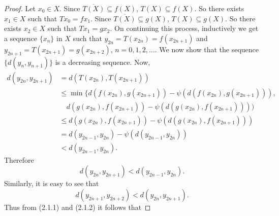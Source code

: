\documentclass[11]{article}
\numberwithin{equation}{definition}
\begin{document}
\begin{proof}
Let $x_{0}\in X.$ Since $\overline{T(X)}\subseteq f(X)$, $T(X)\subseteq f(X).$ So there exists $x_{1}\in X$ such that $Tx_{0}=fx_{1}.$
Since $\overline{T(X)}\subseteq g(X)$, $T(X)\subseteq g(X).$ So there exists $x_{2}\in X$ such that $Tx_{1}=gx_{2}.$
On continuing this process, inductively we get a sequence $\{x_{n}\}$ in $X$ such that $y_{2n}=T(x_{2n})=f(x_{2n+1})$ and $y_{2n+1}=T(x_{2n+1})=g(x_{2n+2})$, $n=0,1,2,\ldots.$
We now show that the sequence $\{d(y_{n},y_{n+1})\}$ is a decreasing sequence. Now,
\begin{align*}
d(y_{2n},y_{2n+1}) &= d(T(x_{2n}),T(x_{2n+1})) \\
&\leq \min\{d(f(x_{2n}),g(x_{2n+1}))-\psi(d(f(x_{2n}),g(x_{2n+1}))), \\
&\quad d(g(x_{2n}),f(x_{2n+1}))-\psi(d(g(x_{2n}),f(x_{2n+1})))) \\
&\leq d(g(x_{2n}),f(x_{2n+1}))-\psi(d(g(x_{2n}),f(x_{2n+1}))) \\
&= d(y_{2n-1},y_{2n})-\psi(d(y_{2n-1},y_{2n})) \\
&< d(y_{2n-1},y_{2n}).
\end{align*}
Therefore
\begin{equation}
d(y_{2n},y_{2n+1})<d(y_{2n-1},y_{2n}).
\end{equation}
Similarly, it is easy to see that
\begin{equation}
d(y_{2n+1},y_{2n+2})<d(y_{2n},y_{2n+1}).
\end{equation}
Thus from (2.1.1) and (2.1.2) it follows that


\end{proof}
\end{document}
